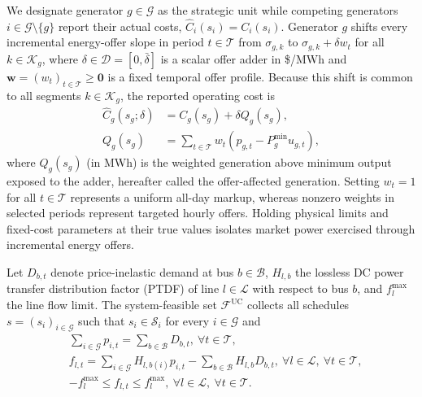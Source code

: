 \documentclass[journal]{IEEEtran}
\newcommand{\Pmin}{P^{\min}}
\newcommand{\UC}{\mathrm{UC}}
\begin{document}
We designate generator $g\in\mathcal{G}$ as the strategic unit while competing generators $i\in\mathcal{G}\setminus\{g\}$ report their actual costs, $\widehat{C}_i(s_i)=C_i(s_i)$. Generator $g$ shifts every incremental energy-offer slope in period $t\in\mathcal{T}$ from $\sigma_{g,k}$ to $\sigma_{g,k}+\delta w_t$ for all $k\in\mathcal{K}_g$, where $\delta\in\mathcal{D}=[0,\bar\delta]$ is a scalar offer adder in \$/MWh and $\bm{w}=(w_t)_{t\in\mathcal{T}}\ge\bm{0}$ is a fixed temporal offer profile. Because this shift is common to all segments $k\in\mathcal{K}_g$, the reported operating cost is
\begin{align}
\widehat{C}_g(s_g;\delta) &= C_g(s_g) + \delta Q_g(s_g),\label{eq:reported-cost}\\
Q_g(s_g) &= \sum\nolimits_{t\in\mathcal{T}} w_t\!\left(p_{g,t}-\Pmin_g u_{g,t}\right),\label{eq:exposure}
\end{align}
where $Q_g(s_g)$ (in MWh) is the weighted generation above minimum output exposed to the adder, hereafter called the offer-affected generation. Setting $w_t\!\!=\!\!1$ for all $t\!\!\in\!\!\mathcal{T}$ represents a uniform all-day markup, whereas nonzero weights in selected periods represent targeted hourly offers. Holding physical limits and fixed-cost parameters at their true values isolates market power exercised through incremental energy offers.

Let $D_{b,t}$ denote price-inelastic demand at bus $b\in\mathcal{B}$, $H_{l,b}$ the lossless DC power transfer distribution factor (PTDF) of line $l\in\mathcal{L}$ with respect to bus $b$, and $f_l^{\max}$ the line flow limit. The system-feasible set $\mathcal{F}^{\UC}$ collects all schedules $s=(s_i)_{i\in\mathcal{G}}$ such that $s_i\in\mathcal{S}_i$ for every $i\in\mathcal{G}$ and
\begin{align}
&\sum\nolimits_{i\in\mathcal{G}} p_{i,t} = \sum\nolimits_{b\in\mathcal{B}} D_{b,t}, \ \forall t\in\mathcal{T},\label{eq:balance}\\
&f_{l,t} \!\!=\!\! \sum\nolimits_{i\in\mathcal{G}} H_{l,b(i)}p_{i,t} \!\!- \!\!\sum\nolimits_{b\!\in\!\mathcal{B}} H_{l,b}D_{b,t}, \ \forall l\!\!\in\!\!\mathcal{L},\ \forall t\!\!\in\!\!\mathcal{T},\label{eq:network}\\
&-f_l^{\max} \le f_{l,t} \le f_l^{\max}, \ \forall l\in\mathcal{L},\ \forall t\in\mathcal{T}.\label{eq:powerflow}
\end{align}
\end{document}
